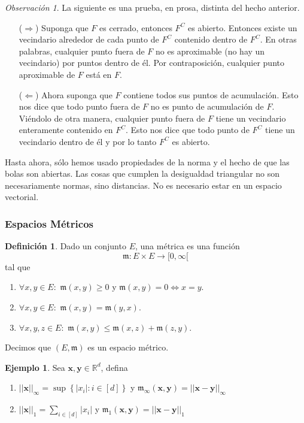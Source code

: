 \documentclass[12pt]{article}
\theoremstyle{plain}
\theoremstyle{definition}
\newtheorem{Def}[Th]{Definición}       %
\newtheorem{Ex}[Th]{Ejemplo}               %
\theoremstyle{remark}
\newtheorem{Rmk}[Th]{Observación}      %
\numberwithin{equation}{section}
\newcommand{\bR}{\mathbb{R}}        %
\newcommand{\mm}{\mathfrak{m}}      %
\renewcommand{\geq}{\geqslant}      %
\renewcommand{\leq}{\leqslant}      %
\renewcommand{\:}{\colon}           %
\renewcommand{\vec}[1]{\mathbf{#1}}
\newcommand{\vx}{\vec{x}}           %
\newcommand{\vy}{\vec{y}}
\newcommand{\conj}[1]{\left\lbrace#1\right\rbrace}
\newcommand{\bonj}[1]{\left\lbrack#1\right\rbrack}
\begin{document}
\begin{multicols}{2}
\begin{ptcbp}
\end{ptcbp}

\begin{Rmk}
  La siguiente es una prueba, en prosa, distinta del hecho anterior.
\end{Rmk}

\begin{ptcb}
\begin{enumerate}
  \item[($\Rightarrow$)] Suponga que $F$ es cerrado, entonces $F^C$ es abierto. Entonces existe un vecindario alrededor de cada punto de $F^C$ contenido dentro de $F^C$. En otras palabras, cualquier punto fuera de $F$ no es aproximable (no hay un vecindario) por puntos dentro de él. Por contraposición, cualquier punto aproximable de $F$ está en $F$.
  \item[($\Leftarrow$)] Ahora suponga que $F$ contiene todos sus puntos de acumulación. Esto nos dice que todo punto fuera de $F$ no es punto de acumulación de $F$. Viéndolo de otra manera, cualquier punto fuera de $F$ tiene un vecindario enteramente contenido en $F^C$. Esto nos dice que todo punto de $F^C$ tiene un vecindario dentro de él y por lo tanto $F^C$ es abierto.
\end{enumerate}
\end{ptcb}
Hasta ahora, sólo hemos usado propiedades de la norma y el hecho de que las bolas son abiertas. Las cosas que cumplen la desigualdad triangular no son necesariamente normas, sino distancias. No es necesario estar en un espacio vectorial.

\subsubsection*{Espacios Métricos}

\begin{Def}
  Dado un conjunto $E$, una métrica es una función $$\mm\colon E\times E\to \lbrack 0,\infty\lbrack$$ tal que
  \begin{enumerate}
    \item $\forall x,y\in E\colon\,\, \mm(x,y)\geq 0$ y $\mm(x,y) =0\iff x=y$.
    \item $\forall x,y\in E\colon\,\, \mm(x,y) = \mm(y,x)$.
    \item $\forall x,y,z\in E\colon\,\, \mm(x,y)\leq \mm(x,z)+\mm(z,y)$.
  \end{enumerate}
  Decimos que $(E,\mm)$ es un espacio métrico.
\end{Def}

\begin{Ex}
Sea $\vec{x},\vy\in\bR^d$, defina
  \begin{enumerate}
    \item $||\vx||_\infty = \sup\conj{|x_i|\colon i\in\bonj{d}}$ y $\mm_\infty(\vx,\vy)=||\vx-\vy||_\infty$
    \item $||\vx||_1 = \sum_{i\in\bonj{d}}|x_i|$ y $\mm_1(\vx,\vy)=||\vx-\vy||_1$
  \end{enumerate}
\end{Ex}


\end{multicols}
\end{document}
